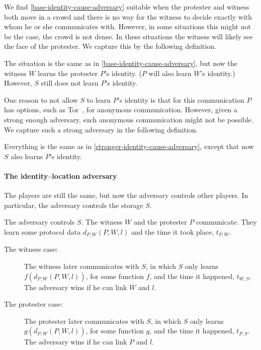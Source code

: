 We find \cref{base-identity-cause-adversary} suitable when the protester and witness both move in a crowd and there is no way for the witness to decide exactly with whom he or she communicates with.
However, in some situations this might not be the case, \eg the crowd is not dense.
In these situations the witness will likely see the face of the protester.
We capture this by the following definition.

\begin{definition}%
  \label{stronger-identity-cause-adversary}
  The situation is the same as in \cref{base-identity-cause-adversary}, but now the 
  witness \(W\) learns the protester \(P\)'s identity.
  (\(P\) will also learn \(W\)'s identity.)
  However, \(S\) still does not learn \(P\)'s identity.
\end{definition}

One reason to not allow \(S\) to learn \(P\)'s identity is that for this communication \(P\) has options, such as Tor~\cite{Tor}, for anonymous communication.
However, given a strong enough adversary, such anonymous communication might not be possible.
We capture such a strong adversary in the following definition.

\begin{definition}%
  \label{strongest-identity-cause-adversary}
  Everything is the same as in \cref{stronger-identity-cause-adversary}, except that now \(S\) also learns \(P\)'s identity.
\end{definition}

\paragraph{The identity--location adversary}

The players are still the same, but now the adversary controls other players.
In particular, the adversary controls the storage \(S\).

\begin{definition}%
  \label{base-identity-location-adversary}
  The adversary controls \(S\).
  The witness \(W\) and the protester \(P\) communicate.
  They learn some protocol data \(d_{P,W}(P, W, l)\) and the time it took 
  place, \(t_{P,W}\).
  \begin{description}
    \item[The witness case:]
      The witness later communicates with \(S\), in which \(S\) only learns 
      \(f(d_{P,W}(P, W, l))\), for some function \(f\), and the time it 
      happened, \(t_{W,S}\).
      The adversary wins if he can link \(W\) and \(l\).
    \item[The protester case:]
      The protester later communicates with \(S\), in which \(S\) only learns 
      \(g(d_{P,W}(P, W, l))\), for some function \(g\), and the time it 
      happened, \(t_{P,S}\).
      The adversary wins if he can link \(P\) and \(l\).
  \end{description}
\end{definition}

